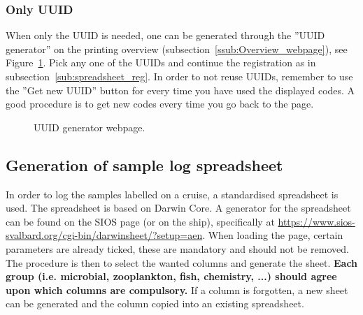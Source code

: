 \documentclass[a4paper,english, 11pt]{article}
\begin{document}
\subsubsection{Only UUID} %
\label{ssub:Only_UUID}

When only the UUID is needed, one can be generated through the ''UUID generator'' on the printing overview (subsection~\ref{ssub:Overview_webpage}), see Figure~\ref{fig:uuid_gen}. Pick any one of the UUIDs and continue the registration as in subsection~\ref{sub:spreadsheet_reg}. In order to not reuse UUIDs, remember to use the ''Get new UUID'' button for every time you have used the displayed codes. A good procedure is to get new codes every time you go back to the page.

\begin{figure}[htb]
    \caption{\label{fig:uuid_gen}
        UUID generator webpage.
    }
\end{figure}



\subsection{Generation of sample log spreadsheet} %
\label{sub:Sample_log_spreadsheet_generation}

In order to log the samples labelled on a cruise, a standardised spreadsheet is used. The spreadsheet is based on Darwin Core. A generator for the spreadsheet can be found on the SIOS page (or on the ship), specifically at \url{https://www.sios-svalbard.org/cgi-bin/darwinsheet/?setup=aen}. When loading the page, certain parameters are already ticked, these are mandatory and should not be removed.  
The procedure is then to select the wanted columns and generate the sheet. \textbf{Each group (i.e. microbial, zooplankton, fish, chemistry, ...) should agree upon which columns are compulsory.} If a column is forgotten, a new sheet can be generated and the column copied into an existing spreadsheet.
\end{document}
